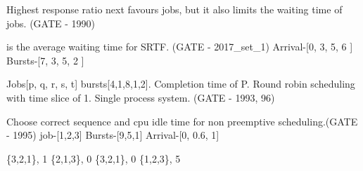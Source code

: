

\begin{questyle}


  \question Highest response ratio next favours   jobs, but it also limits the
            waiting time of  jobs. (GATE - 1990)

  \end{questyle}





\begin{questyle}

  \question \fillin[.........] is the average waiting time for SRTF. (GATE - 2017\_set\_1) \newline
            [P1, P2, P3, P4]
            Arrival-[0,  3,  5,  6 ]
            Bursts-[7,  3,  5,  2 ]

  \end{questyle}





\begin{questyle}

  \question Jobs[p, q, r, s, t] bursts[4,1,8,1,2]. Completion time of P. Round robin scheduling with time slice of 1.
            Single process system. (GATE - 1993, 96)

  \begin{oneparchoices}
  \end{oneparchoices}


  \end{questyle}





\begin{questyle}

  \question  Choose correct sequence and cpu idle time for non preemptive scheduling.(GATE - 1995)
             \newline job-[1,2,3] Bursts-[9,5,1] Arrival-[0, 0.6, 1]

  \begin{oneparchoices}
    \choice \{3,2,1\}, 1
    \choice \{2,1,3\}, 0
    \choice \{3,2,1\}, 0
    \choice \{1,2,3\}, 5
  \end{oneparchoices}

  \end{questyle}



